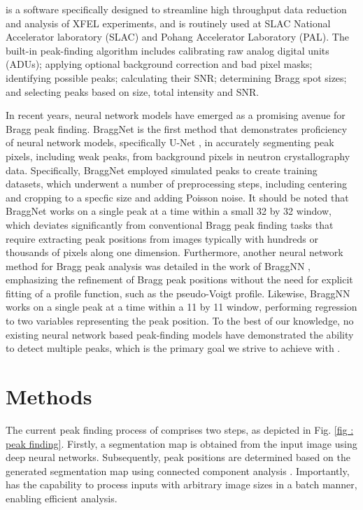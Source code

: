 \documentclass[a4paper]{article}
\begin{document}
\psocake{} is a software specifically designed to streamline high throughput data reduction and analysis of XFEL experiments, and is routinely used at SLAC National Accelerator laboratory (SLAC) and Pohang Accelerator Laboratory (PAL).  The built-in peak-finding algorithm \citep{shinDataAnalysisUsing2018} includes calibrating raw analog digital units (ADUs); applying optional background correction and bad pixel masks; identifying possible peaks; calculating their SNR; determining Bragg spot sizes; and selecting peaks based on size, total intensity and SNR.

In recent years, neural network models have emerged as a promising avenue for Bragg peak finding.  BraggNet \citep{sullivanBraggNetIntegratingBragg2019} is the first method that demonstrates proficiency of neural network models, specifically U-Net \citep{ronnebergerUNetConvolutionalNetworks2015}, in accurately segmenting peak pixels, including weak peaks, from background pixels in neutron crystallography data.  Specifically, BraggNet employed simulated peaks to create training datasets, which underwent a number of preprocessing steps, including centering and cropping to a specfic size and adding Poisson noise.  It should be noted that BraggNet works on a single peak at a time within a small 32 by 32 window, which deviates significantly from conventional Bragg peak finding tasks that require extracting peak positions from images typically with hundreds or thousands of pixels along one dimension.  Furthermore, another neural network method for Bragg peak analysis was detailed in the work of BraggNN \citep{liuBraggNNFastXray2021}, emphasizing the refinement of Bragg peak positions without the need for explicit fitting of a profile function, such as the pseudo-Voigt profile.  Likewise, BraggNN works on a single peak at a time within a 11 by 11 window, performing regression to two variables representing the peak position.  To the best of our knowledge, no existing neural network based peak-finding models have demonstrated the ability to detect multiple peaks, which is the primary goal we strive to achieve with \peaknet{}.


\section{Methods}

The current peak finding process of \peaknet{} comprises two steps, as depicted in Fig. \ref{fig : peak finding}.  Firstly, a segmentation map is obtained from the input image using deep neural networks.  Subsequently, peak positions are determined based on the generated segmentation map using connected component analysis \citep{weaverCentrosymmetricCrossSymmetricMatrices1985}.  Importantly, \peaknet{} has the capability to process inputs with arbitrary image sizes in a batch manner, enabling efficient analysis.
\end{document}
